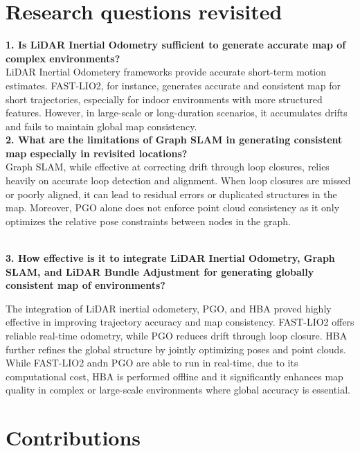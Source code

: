 \section{Research questions revisited}
\textbf{1. Is LiDAR Inertial Odometry sufficient to generate accurate map of complex environments?\\}
LiDAR Inertial Odometery frameworks provide accurate short-term motion estimates. FAST-LIO2, for instance, generates accurate and consistent map for short trajectories, especially for indoor environments with more structured features. However, in large-scale or long-duration scenarios, it accumulates drifts and fails to maintain global map consistency.
\textbf{\\2. What are the limitations of Graph SLAM in generating consistent map especially
	in revisited locations?\\}
Graph SLAM, while effective at correcting drift through loop closures, relies heavily on accurate loop detection and alignment. When loop closures are missed or poorly aligned, it can lead to residual errors or duplicated structures in the map. Moreover, PGO alone does not enforce point cloud consistency as it only optimizes the relative pose constraints between nodes in the graph.

\textbf{\\3. How effective is it to integrate LiDAR Inertial Odometry, Graph SLAM, and LiDAR Bundle Adjustment for generating globally consistent map of environments?}

The integration of LiDAR inertial odometery, PGO, and HBA proved highly effective in improving trajectory accuracy and map consistency. FAST-LIO2 offers reliable real-time odometry, while PGO reduces drift through loop closure. HBA further refines the global structure by jointly optimizing poses and point clouds. While FAST-LIO2 andn PGO are able to run in real-time, due to its computational cost, HBA is performed offline and it significantly enhances map quality in complex or large-scale environments where global accuracy is essential.
\section{Contributions}
